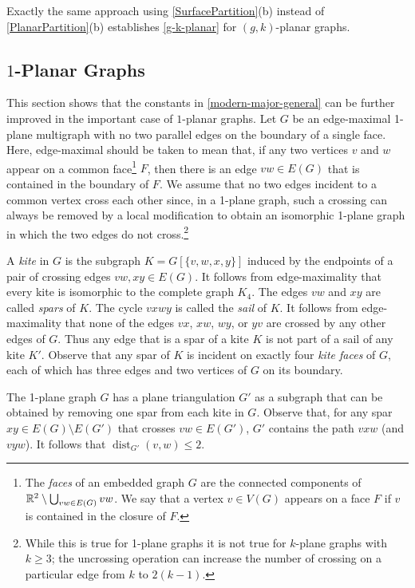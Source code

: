 \documentclass{patmorin}
\DeclareMathOperator{\dist}{dist}
\renewcommand{\ge}{\geqslant}
\renewcommand{\le}{\leqslant}
\begin{document}
Exactly the same approach using \cref{SurfacePartition}(b) instead of \cref{PlanarPartition}(b) establishes 
\cref{g-k-planar} for $(g,k)$-planar graphs. 


\subsection{\boldmath  $1$-Planar Graphs}
\label{sec-1-planar}

This section shows that the constants in \cref{modern-major-general} can be further improved in the important case of $1$-planar graphs. Let $G$ be an edge-maximal 1-plane multigraph with no two parallel edges on the boundary of a single face.  Here, edge-maximal should be taken to mean that, if any two vertices $v$ and $w$ appear on a common face\footnote{The \emph{faces} of an embedded graph $G$ are the connected components of $\mathbb{R}^2\setminus \bigcup_{vw\in E(G)} vw$.  We say that a vertex $v\in V(G)$ appears on a face $F$ if $v$ is contained in the closure of $F$.} $F$, then there is an edge $vw\in E(G)$ that is contained in the boundary of $F$.  We assume that no two edges incident to a common vertex cross each other since, in a 1-plane graph, such a crossing can always be removed by a local modification to obtain an isomorphic 1-plane graph in which the two edges do not cross.\footnote{While this is true for 1-plane graphs it is not true for $k$-plane graphs with $k\ge 3$; the uncrossing operation can increase the number of crossing on a particular edge from $k$ to $2(k-1)$.}

A \emph{kite} in $G$ is the subgraph $K=G[\{v,w,x,y\}]$ induced by the endpoints of a pair of crossing edges $vw,xy\in E(G)$.  It follows from edge-maximality that every kite is isomorphic to the complete graph $K_4$.
The edges $vw$ and $xy$ are called \emph{spars} of $K$.  The cycle $vxwy$ is called the \emph{sail} of $K$.  It follows from edge-maximality that none of the edges $vx$, $xw$, $wy$, or $yv$ are crossed by any other edges of $G$. Thus any edge that is a spar of a kite $K$ is not part of a sail of any kite $K'$. Observe that any spar of $K$ is incident on exactly four \emph{kite faces} of $G$, each of which has three edges and two vertices of $G$ on its boundary.

The 1-plane graph $G$ has a plane triangulation $G'$ as a subgraph that can be obtained by removing one spar from each kite in $G$.  Observe that, for any spar $xy\in E(G)\setminus E(G')$ that crosses $vw\in E(G')$, $G'$ contains the path $vxw$ (and $vyw$).  It follows that $\dist_{G'}(v,w)\le 2$. 
\end{document}
